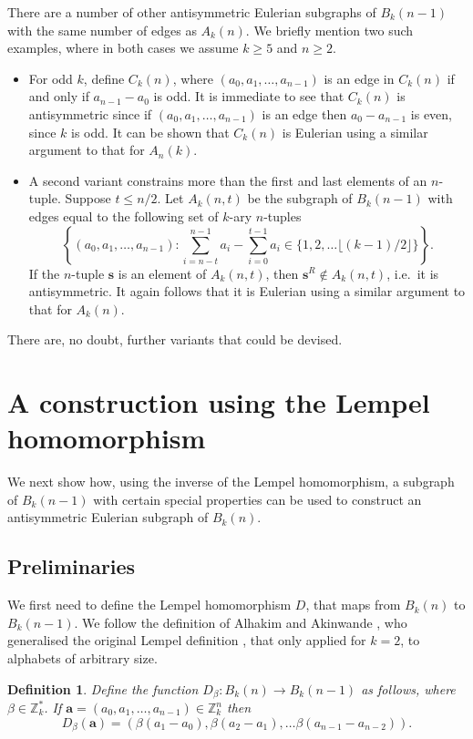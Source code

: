 \documentclass[a4paper,11pt]{article}
\newtheorem{definition}[lemma]{Definition}
\begin{document}
There are a number of other antisymmetric Eulerian subgraphs of $B_{k}(n-1)$ with the same number
of edges as $A_k(n)$.  We briefly mention two such examples, where in both cases we assume $k\geq
5$ and $n\geq2$.
\begin{itemize}
\item For odd $k$, define $C_k(n)$, where $(a_0,a_1,\ldots,a_{n-1})$ is an edge in $C_k(n)$ if
    and only if $a_{n-1}-a_0$ is odd. It is immediate to see that $C_k(n)$ is antisymmetric
    since if $(a_0,a_1,\ldots,a_{n-1})$ is an edge then $a_{0}-a_{n-1}$ is even, since $k$ is
    odd.  It can be shown that $C_k(n)$ is Eulerian using a similar argument to that for
    $A_n(k)$.

\item A second variant constrains more than the first and last elements of an $n$-tuple.
    Suppose $t\leq n/2$. Let $A_k(n,t)$ be the subgraph of $B_{k}(n-1)$ with edges equal to
the
    following set of $k$-ary $n$-tuples
\[ \left\{ (a_0,a_1,\ldots,a_{n-1}) :  \sum_{i=n-t}^{n-1}a_i-\sum_{i=0}^{t-1} a_i
\in\{1,2,\ldots\lfloor(k-1)/2\rfloor\} \right\}.  \]
If the $n$-tuple $\mathbf{s}$ is an element of $A_k(n,t)$, then $\mathbf{s}^R\not\in
A_k(n,t)$,
i.e.\ it is antisymmetric.  It again follows that it is Eulerian using a similar argument to
that for $A_k(n)$.
\end{itemize}
There are, no doubt, further variants that could be devised.

\section{A construction using the Lempel homomorphism}  \label{section:Lempel_construction}

We next show how, using the inverse of the Lempel homomorphism, a subgraph of $B_{k}(n-1)$ with
certain special properties can be used to construct an antisymmetric Eulerian subgraph of
$B_{k}(n)$.

\subsection{Preliminaries}

We first need to define the Lempel homomorphism $D$, that maps from $B_k(n)$ to $B_{k}(n-1)$. We
follow the definition of Alhakim and Akinwande \cite{Alhakim11}, who generalised the original
Lempel definition \cite{Lempel70}, that only applied for $k=2$, to alphabets of arbitrary size.

\begin{definition} \label{Lempel}
Define the function $D_{\beta}:B_k(n)\rightarrow B_{k}(n-1)$ as follows, where
$\beta\in\mathbb{Z}^*_k$. If $\mathbf{a} = (a_0,a_1,\ldots,a_{n-1})\in \mathbb{Z}_k^n$ then
\[ D_{\beta}(\mathbf{a}) = (\beta(a_1-a_0),\beta(a_2-a_1),\ldots\beta(a_{n-1}-a_{n-2})). \]
\end{definition}
\end{document}

